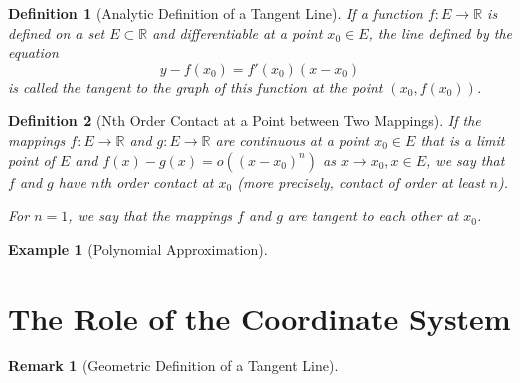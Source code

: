 \documentclass[onecolumn]{ctexart}
\newtheorem{definition}{Definition}
\newtheorem{remark}{Remark}
\newtheorem{example}{Example}
\begin{document}
\begin{definition}[Analytic Definition of a Tangent Line]
  If a function $f:E \to \mathbb{R}$ is defined on a set $E \subset \mathbb{R}$ 
  and differentiable at a point $x_0 \in E$, the line defined by the equation
  \begin{equation}
    y - f(x_0) = f'(x_0)(x - x_0)
  \end{equation}
  is called the tangent to the graph of this function at the point $(x_0, f(x_0))$.
\end{definition}

\begin{definition}[Nth Order Contact at a Point between Two Mappings]
  If the mappings $f:E \to \mathbb{R}$ and $g:E \to \mathbb{R}$ are continuous 
  at a point $x_0 \in E$ that is a limit point of $E$ and $f(x) - g(x) = 
  o((x - x_0)^n)$ as $x \to x_0, x \in E$, we say that $f$ and $g$ have $n$th 
  order contact at $x_0$ (more precisely, contact of order at least $n$).

  For $n = 1$, we say that the mappings $f$ and $g$ are tangent to each other 
  at $x_0$.
\end{definition}
\begin{example}[Polynomial Approximation]
  
\end{example}

\section{The Role of the Coordinate System}

\begin{remark}[Geometric Definition of a Tangent Line]
  
\end{remark}
\end{document}
